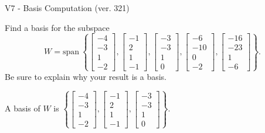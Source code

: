 \begin{exercise}
  \begin{exerciseTitle}V7 - Basis Computation (ver. 321)\end{exerciseTitle}
  \begin{exerciseStatement}
    Find a basis for the subspace 
\[W=\mathrm{span}\ \left\{\left[\begin{array}{r}
-4 \\
-3 \\
1 \\
-2
\end{array}\right] , \left[\begin{array}{r}
-1 \\
2 \\
1 \\
-1
\end{array}\right] , \left[\begin{array}{r}
-3 \\
-3 \\
1 \\
0
\end{array}\right] , \left[\begin{array}{r}
-6 \\
-10 \\
0 \\
-2
\end{array}\right] , \left[\begin{array}{r}
-16 \\
-23 \\
1 \\
-6
\end{array}\right]\right\}.\]
 Be sure to explain why your result is a basis.


  \end{exerciseStatement}
  \begin{exerciseAnswer}
   A basis of \(W\) is  \(\left\{\left[\begin{array}{r}
-4 \\
-3 \\
1 \\
-2
\end{array}\right] , \left[\begin{array}{r}
-1 \\
2 \\
1 \\
-1
\end{array}\right] , \left[\begin{array}{r}
-3 \\
-3 \\
1 \\
0
\end{array}\right]\right\}\).
  


  \end{exerciseAnswer}
\end{exercise}